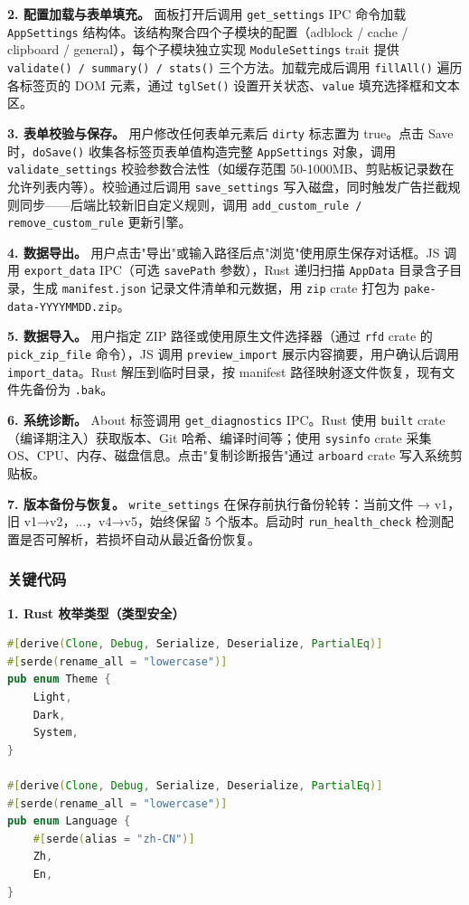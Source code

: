 \documentclass[12pt,a4paper]{ctexart}
\begin{document}
\textbf{2. 配置加载与表单填充。}
面板打开后调用 \texttt{get\_settings} IPC 命令加载 \texttt{AppSettings} 结构体。该结构聚合四个子模块的配置（adblock / cache / clipboard / general），每个子模块独立实现 \texttt{ModuleSettings} trait 提供 \texttt{validate() / summary() / stats()} 三个方法。加载完成后调用 \texttt{fillAll()} 遍历各标签页的 DOM 元素，通过 \texttt{tglSet()} 设置开关状态、\texttt{value} 填充选择框和文本区。

\textbf{3. 表单校验与保存。}
用户修改任何表单元素后 \texttt{dirty} 标志置为 true。点击 Save 时，\texttt{doSave()} 收集各标签页表单值构造完整 \texttt{AppSettings} 对象，调用 \texttt{validate\_settings} 校验参数合法性（如缓存范围 50-1000MB、剪贴板记录数在允许列表内等）。校验通过后调用 \texttt{save\_settings} 写入磁盘，同时触发广告拦截规则同步——后端比较新旧自定义规则，调用 \texttt{add\_custom\_rule / remove\_custom\_rule} 更新引擎。

\textbf{4. 数据导出。}
用户点击"导出"或输入路径后点"浏览"使用原生保存对话框。JS 调用 \texttt{export\_data} IPC（可选 \texttt{savePath} 参数），Rust 递归扫描 \texttt{AppData} 目录含子目录，生成 \texttt{manifest.json} 记录文件清单和元数据，用 \texttt{zip} crate 打包为 \texttt{pake-data-YYYYMMDD.zip}。

\textbf{5. 数据导入。}
用户指定 ZIP 路径或使用原生文件选择器（通过 \texttt{rfd} crate 的 \texttt{pick\_zip\_file} 命令），JS 调用 \texttt{preview\_import} 展示内容摘要，用户确认后调用 \texttt{import\_data}。Rust 解压到临时目录，按 manifest 路径映射逐文件恢复，现有文件先备份为 \texttt{.bak}。

\textbf{6. 系统诊断。}
About 标签调用 \texttt{get\_diagnostics} IPC。Rust 使用 \texttt{built} crate（编译期注入）获取版本、Git 哈希、编译时间等；使用 \texttt{sysinfo} crate 采集 OS、CPU、内存、磁盘信息。点击"复制诊断报告"通过 \texttt{arboard} crate 写入系统剪贴板。

\textbf{7. 版本备份与恢复。}
\texttt{write\_settings} 在保存前执行备份轮转：当前文件 → v1，旧 v1→v2，...，v4→v5，始终保留 5 个版本。启动时 \texttt{run\_health\_check} 检测配置是否可解析，若损坏自动从最近备份恢复。

\subsubsection{关键代码}

\textbf{1. Rust 枚举类型（类型安全）}

\begin{lstlisting}[language=Rust, caption=Theme 和 Language 枚举]
#[derive(Clone, Debug, Serialize, Deserialize, PartialEq)]
#[serde(rename_all = "lowercase")]
pub enum Theme {
    Light,
    Dark,
    System,
}

#[derive(Clone, Debug, Serialize, Deserialize, PartialEq)]
#[serde(rename_all = "lowercase")]
pub enum Language {
    #[serde(alias = "zh-CN")]
    Zh,
    En,
}
\end{lstlisting}
\end{document}
